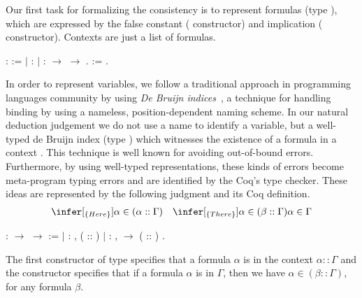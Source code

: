 Our first task for formalizing the consistency is to represent formulas (type \coqdocvar{$\alpha$}), which
are expressed by the false constant ( constructor) and implication ( constructor).
Contexts are just a list of formulas.
\begin{coqdoccode}
\coqdocemptyline
\coqdocnoindent
{} \coqdocvar{$\alpha$} :  :=\coqdoceol
\coqdocnoindent
\ensuremath{|}  : \coqdocvar{$\alpha$}\coqdoceol
\coqdocnoindent
\ensuremath{|}  : \coqdocvar{$\alpha$} \ensuremath{\rightarrow} \coqdocvar{$\alpha$} \ensuremath{\rightarrow} \coqdocvar{$\alpha$}.\coqdoceol
\coqdocemptyline
\coqdocnoindent
{} \coqdocvar{$\Gamma$} :=  \coqdocvar{$\alpha$}.\coqdoceol
\coqdocemptyline
\end{coqdoccode}
In order to represent variables, we follow a traditional approach in programming languages community
by using \emph{De Bruijn indices}~\cite{DeBruijn71}, a technique for handling binding by using a
nameless, position-dependent naming scheme. In our natural deduction judgement we do not
use a name to identify a variable, but a well-typed de Bruijn index (type ) which witnesses the existence
of a formula  in a context \coqdocvar{$\Gamma$}. This technique is well known for avoiding out-of-bound errors. Furthermore, by
using well-typed representations, these kinds of errors become meta-program typing errors and are identified
by the Coq's type checker. These ideas are represented by the following judgment and its Coq definition.
\[
\begin{array}{cc}
\infer[_{\{Here\}}]{\alpha \in (\alpha :: \Gamma)}{} &
\infer[_{\{There\}}]{\alpha \in (\beta :: \Gamma)}{\alpha \in \Gamma}
\end{array}
\]
 \begin{coqdoccode}
\coqdocemptyline
\coqdocnoindent
{}  : \coqdocvar{$\Gamma$} \ensuremath{\rightarrow} \coqdocvar{$\alpha$} \ensuremath{\rightarrow}  :=\coqdoceol
\coqdocnoindent
\ensuremath{|}  : \coqdockw{\ensuremath{\forall}}  ,  ( :: ) \coqdoceol
\coqdocnoindent
\ensuremath{|}  : \coqdockw{\ensuremath{\forall}}   ,    \ensuremath{\rightarrow}  ( :: ) .\coqdoceol
\coqdocemptyline
\end{coqdoccode}
The first constructor of type  specifies that a formula $\alpha$ is in the context $\alpha :: \Gamma$ and
the constructor  specifies that if a formula $\alpha$ is in $\Gamma$, then we have
 $\alpha \in (\beta :: \Gamma)$, for any formula $\beta$.


